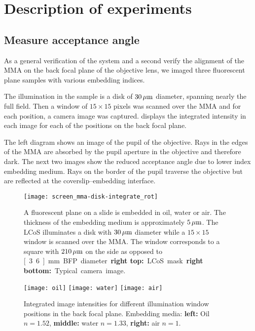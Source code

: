 \chapter{Description of experiments}
\label{sec:experiments}
\section{Measure acceptance angle}
As a general verification of the system and a second verify the
alignment of the MMA on the back focal plane of the objective lens, we
imaged three fluorescent plane samples with various embedding indices.

The illumination in the sample is a disk of $\unit[30]{\mu m}$
diameter, spanning nearly the full field. Then a window of
$15\times15$ pixels was scanned over the MMA and for each position, a
camera image was captured.  displays
the integrated intensity in each image for each of the positions on
the back focal plane.

The left diagram shows an image of the pupil of the objective. Rays in
the edges of the MMA are absorbed by the pupil aperture in the
objective and therefore dark. The next two images show the reduced
acceptance angle due to lower index embedding medium. Rays on the
border of the pupil traverse the objective but are reflected at the
coverslip--embedding interface.

\begin{figure}[H]
  \centering
   
  \texttt{[image: screen\_mma-disk-integrate\_rot]}
  \caption{A fluorescent plane on a slide is embedded in oil, water or
    air. The thickness of the embedding medium is approximately
    $\unit[5]{\mu m}$. The LCoS illuminates a disk with $\unit[30]{\mu
      m}$ diameter while a $15\times 15$ window is scanned over the
    MMA. The window corresponds to a square with $\unit[210]{\mu m}$ on the side as opposed to \unit[3.6]{mm} BFP diameter {\bf right top:} LCoS mask. {\bf right bottom:} Typical
    camera image.}
  \label{fig:tirf-exp}
\end{figure}


\begin{figure}[H]
  \centering
  \texttt{[image: oil]}
  \texttt{[image: water]}
  \texttt{[image: air]}
  \caption{Integrated image intensities for different illumination
    window positions in the back focal plane. Embedding media: {\bf
      left:} Oil $n=1.52$, {\bf middle:} water $n=1.33$, {\bf right:}
    air $n=1$.  }
  \label{fig:immersion-bfp-scan}
\end{figure}

